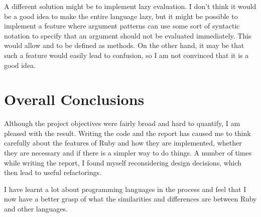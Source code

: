 A different solution might be to implement lazy evaluation. I don't think it would be a good idea to make the entire language lazy, but it might be possible to implement a feature where argument patterns can use some sort of syntactic notation to specify that an argument should not be evaluated immediately. This would allow \code{&&} and \code{||} to be defined as methods. On the other hand, it may be that such a feature would easily lead to confusion, so I am not convinced that it is a good idea.

\section{Overall Conclusions}

Although the project objectives were fairly broad and hard to quantify, I am pleased with the result. Writing the code and the report has caused me to think carefully about the features of Ruby and how they are implemented, whether they are necessary and if there is a simpler way to do things. A number of times while writing the report, I found myself reconsidering design decisions, which then lead to useful refactorings.

I have learnt a lot about programming languages in the process and feel that I now have a better grasp of what the similarities and differences are between Ruby and other languages.
